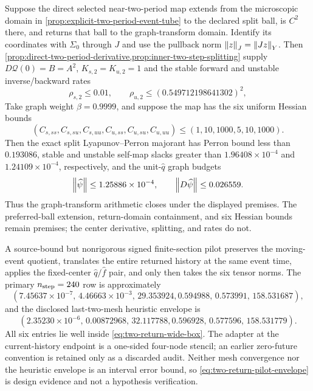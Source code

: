 \begin{proposition}
\label{prop:two-return-graph-arithmetic}
Suppose the direct selected near-two-period map extends from the microscopic
domain in \cref{prop:explicit-two-period-event-tube} to the declared split
ball, is \(C^2\) there, and returns that ball to the graph-transform domain.
Identify its coordinates with \(\Sigma_0\) through \(J\) and use the pullback
norm \(\left\lVert z\right\rVert_J=\left\lVert Jz\right\rVert_Y\).  Then
\cref{prop:direct-two-period-derivative,prop:inner-two-step-splitting} supply
\(D\mathcal Q(0)=B=A^2\),
\(K_{s,2}=K_{u,2}=1\) and the stable forward and unstable inverse/backward
rates
\[
 \rho_{s,2}\le0.01,\qquad
 \rho_{u,2}\le(0.549712198641302)^2,
\]
Take graph weight \(\beta=0.9999\), and suppose the map has the six uniform
Hessian bounds
\begin{equation}
 (C_{s,ss},C_{s,su},C_{s,uu},C_{u,ss},C_{u,su},C_{u,uu})
 \le(1,10,1000,5,10,1000).                            \label{eq:two-return-wide-box}
\end{equation}
Then the exact split Lyapunov--Perron majorant has Perron bound
less than \(0.193086\), stable and unstable self-map slacks greater than
\(1.96408\times10^{-4}\) and \(1.24109\times10^{-4}\), respectively, and
the unit-\(\widehat q\) graph budgets
\begin{equation}
 \left\lVert\widehat\psi\right\rVert\le1.25886\times10^{-4},
 \qquad \left\lVert D\widehat\psi\right\rVert\le0.026559.              \label{eq:two-return-graph-budgets}
\end{equation}
Thus the graph-transform arithmetic closes under the displayed premises.
The preferred-ball extension, return-domain containment, and six Hessian
bounds remain premises; the center derivative, splitting, and rates do not.
\end{proposition}

A source-bound but nonrigorous signed finite-section pilot preserves the
moving-event quotient, translates the entire returned history at the same
event time, applies the fixed-center \(\widehat q/\widehat f\) pair, and
only then takes the six tensor norms.  The primary
\(n_{\rm step}=240\) row is
approximately
\[
 (7.45637\!\times\!10^{-7},\,4.46663\!\times\!10^{-3},\,29.353924,
   0.594988,\,0.573991,\,158.531687),
\]
and the disclosed last-two-mesh heuristic envelope is
\begin{equation}
 (2.35230\!\times\!10^{-6},\,0.00872968,\,32.117788,
   0.596928,\,0.577596,\,158.531779).                  \label{eq:two-return-pilot-envelope}
\end{equation}
All six entries lie well inside \cref{eq:two-return-wide-box}.  The adapter
at the current-history endpoint is a one-sided four-node stencil; an earlier
zero-future convention is retained only as a discarded audit.  Neither mesh
convergence nor the heuristic envelope is an interval error bound, so
\cref{eq:two-return-pilot-envelope} is design evidence and not a hypothesis
verification.

